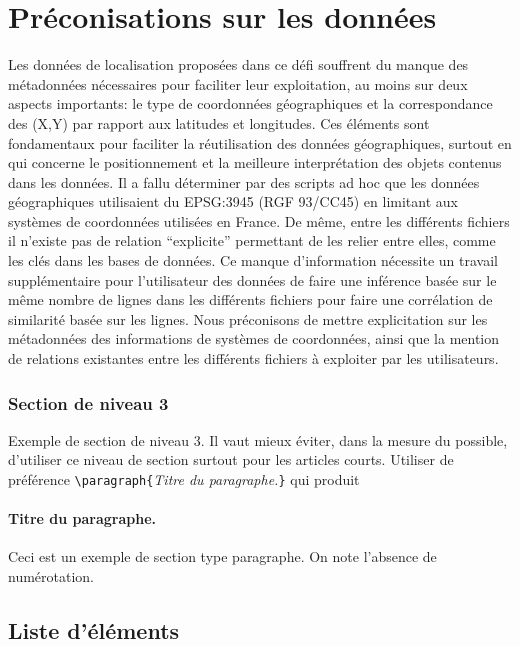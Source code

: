 \documentclass[a4paper,pagenum,french,showlayout]{rnti}
\begin{document}
\section{Préconisations sur les données}
Les données de localisation proposées dans ce défi souffrent du manque des métadonnées nécessaires pour faciliter leur exploitation, au moins sur deux aspects importants: le type de coordonnées géographiques et la correspondance des (X,Y) par rapport aux latitudes et longitudes. Ces éléments sont fondamentaux pour faciliter la réutilisation des données géographiques, surtout en qui concerne le positionnement et la meilleure interprétation des objets contenus dans les données. Il a fallu déterminer par des scripts ad hoc que les données géographiques utilisaient du EPSG:3945 (RGF 93/CC45) en limitant aux systèmes de coordonnées utilisées en France. 
De même, entre les différents fichiers il n’existe pas de relation “explicite” permettant de les relier entre elles, comme les clés dans les bases de données. Ce manque d’information nécessite un travail supplémentaire pour l’utilisateur des données de faire une inférence basée sur le même nombre de lignes dans les différents fichiers pour faire une corrélation de similarité basée sur les lignes.
Nous préconisons de mettre explicitation sur les métadonnées des informations de systèmes de coordonnées, ainsi que la mention de relations existantes entre les différents fichiers à exploiter par les utilisateurs. 


\subsubsection{Section de niveau 3}

Exemple de section de niveau 3. Il vaut mieux éviter, dans la mesure
du possible, d'utiliser ce niveau de section surtout pour les
articles courts. Utiliser de préférence
\verb+\paragraph{+\textit{Titre du paragraphe.}\verb+}+ qui produit

\paragraph{Titre du paragraphe.} Ceci est un exemple de section type
paragraphe. On note l'absence de numérotation.

\subsection{Liste d'éléments}
\end{document}
